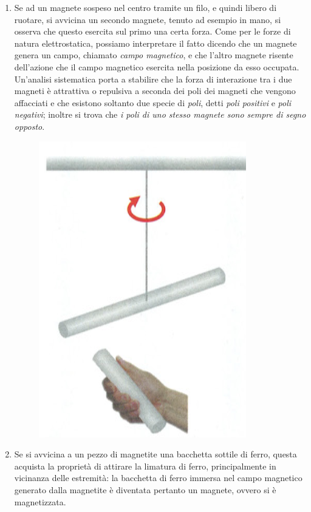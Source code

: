 \documentclass[class=book, crop=false, oneside, 12pt]{standalone}
\begin{document}
\begin{enumerate}
    \item Se ad un magnete sospeso nel centro tramite un filo, e quindi libero di ruotare, si avvicina un secondo magnete, tenuto ad esempio in mano, si osserva che questo esercita sul primo una certa forza. 
    Come per le forze di natura elettrostatica, possiamo interpretare il fatto dicendo che un magnete genera un campo, chiamato \emph{campo magnetico}, e che l'altro magnete risente dell'azione che il campo magnetico esercita nella posizione da esso occupata. 
    Un'analisi sistematica porta a stabilire che la forza di interazione tra i due magneti è attrattiva o repulsiva a seconda dei poli dei magneti che vengono affacciati e che esistono soltanto due specie di \emph{poli}, detti \emph{poli positivi} e \emph{poli negativi}; inoltre si trova che \emph{i poli di uno stesso magnete sono sempre di segno opposto}. 
    \begin{figure}[h]
        \includegraphics[scale=0.4]{magnete_filo.png}
        \centering
        \caption{}
    \end{figure}
    \item Se si avvicina a un pezzo di magnetite una bacchetta sottile di ferro, questa acquista la proprietà di attirare la limatura di ferro, principalmente in vicinanza delle estremità: la bacchetta di ferro immersa nel campo magnetico generato dalla magnetite è diventata pertanto un magnete, ovvero si è magnetizzata. 

\end{enumerate}
\end{document}
